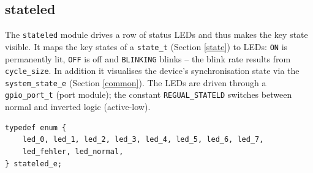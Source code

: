 \subsection{stateled}\label{stateled}
The \verb|stateled| module drives a row of status LEDs and thus makes the key
state visible. It maps the key states of a \verb|state_t| (Section \ref{state})
to LEDs: \verb|ON| is permanently lit, \verb|OFF| is off and \verb|BLINKING|
blinks -- the blink rate results from \verb|cycle_size|. In addition it
visualises the device's synchronisation state via the \verb|system_state_e|
(Section \ref{common}). The LEDs are driven through a \verb|gpio_port_t| (port
module); the constant \verb|REGUAL_STATELD| switches between normal and
inverted logic (active-low).

\begin{listing}
\begin{verbatim}
typedef enum {
    led_0, led_1, led_2, led_3, led_4, led_5, led_6, led_7,
    led_fehler, led_normal,
} stateled_e;
\end{verbatim}
\caption{LED identifiers \texttt{stateled\_e}}
\label{stateled_e}
\end{listing}

